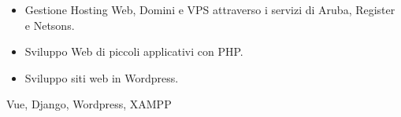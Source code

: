 \begin{experiences}
{\begin{itemize}
            In generale questi gestionali ricadevano tutti nella gestione dei clienti e dei loro appuntamenti, ordini di vendita, preventivi, noleggi, interventi o manutenzioni.
			\item Gestione Hosting Web, Domini e VPS attraverso i servizi di Aruba, Register e Netsons.
			\item Sviluppo Web di piccoli applicativi con PHP.
			\item Sviluppo siti web in Wordpress.                         
		\end{itemize}
	}
	{Vue, Django, Wordpress, XAMPP}
	
	 
	
\end{experiences}